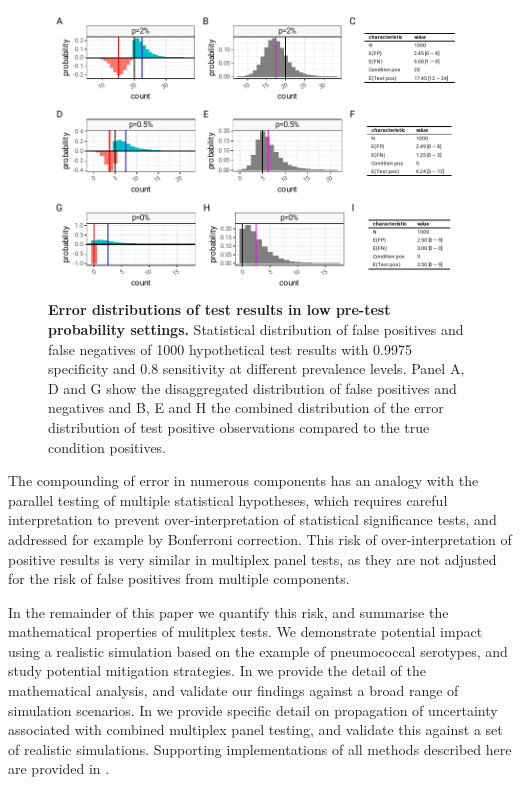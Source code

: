 \documentclass[10pt,letterpaper]{article}
\begin{document}
\begin{figure}[h!]
\centerline{\includegraphics{fig/low-prevalence-sensitivity-specificity.pdf}}
\caption{{\bf Error distributions of test results in low pre-test probability settings.}
Statistical distribution of false positives and false negatives of 1000 hypothetical test results with 0.9975 specificity and 0.8 sensitivity at different prevalence levels. Panel A, D and G show the disaggregated distribution of false positives and negatives and B, E and H the combined distribution of the error distribution of test positive observations compared to the true condition positives.}
\label{fig2}
\end{figure}

The compounding of error in numerous components has an analogy with the parallel testing of multiple statistical hypotheses, which requires careful interpretation to prevent over-interpretation of statistical significance tests, and addressed for example by Bonferroni correction\cite{shaffer1995}. This risk of over-interpretation of positive results is very similar in multiplex panel tests, as they are not adjusted for the risk of false positives from multiple components.

In the remainder of this paper we quantify this risk, and summarise the mathematical properties of mulitplex tests. We demonstrate potential impact using a realistic simulation based on the example of pneumococcal serotypes, and study potential mitigation strategies. In  we provide the detail of the mathematical analysis, and validate our findings against a broad range of simulation scenarios. In  we provide specific detail on propagation of uncertainty associated with combined multiplex panel testing, and validate this against a set of realistic simulations. Supporting implementations of all methods described here are provided in .
\end{document}
